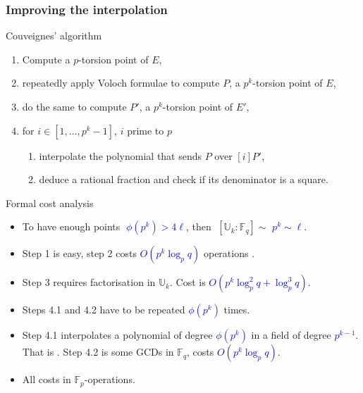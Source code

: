 \documentclass[10pt]{beamer}
\newcommand{\blue}[1]{\textcolor{blue}{#1}}  %
\newcommand{\U}{\mathbb{U}}  %
\newcommand{\F}{\mathbb{F}}  %
\newcommand{\euler}{\phi}  %
\newcommand{\0}{\mathcal{O}}  %
\begin{document}

\begin{frame}
  \frametitle{Improving the interpolation}

  \vspace{-2mm}

  \begin{block}{Couveignes' algorithm}
    \begin{enumerate}
    \item Compute a $p$-torsion point of $E$,
    \item repeatedly apply Voloch formulae to compute $P$, a $p^k$-torsion
      point of $E$,
    \item do the same to compute $P'$, a $p^k$-torsion point
      of $E'$,
    \item for $i \in [1,\dots,p^k-1]$, $i$ prime to $p$
      \begin{enumerate}
      \item interpolate the polynomial that sends $P$ over $[i]P'$,
      \item deduce a rational fraction and check if its denominator is
        a square.
      \end{enumerate}
    \end{enumerate}
  \end{block}

  \vspace{-2mm}

  \begin{block}{Formal cost analysis}
    \begin{itemize}
    \item To have enough points \blue{$\;\euler(p^k) > 4\ell$}, then
      $\;[\U_k:\F_q] \sim$ \blue{$p^k \sim \ell$}.
    \item Step 1 is easy, step 2 costs \blue{$O(p^k\log_pq)$}
      operations .
    \item Step 3 requires factorisation in $\U_k$. Cost is
      \blue{$O(p^{k}\log_p^2q + \log_p^3q)$}.
    \item Steps 4.1 and 4.2 have to be repeated
      \blue{$\euler(p^k)$} times.
    \item Step 4.1 interpolates a polynomial of degree
      \blue{$\euler(p^k)$} in a field of degree \blue{$p^{k-1}$}. That
      is
      \alt<2>{\alert{$O(p^{2k}\log_pq)$}}{\blue{$O(p^{2k}\log_pq)$}}. Step
      4.2 is some GCDs in $\F_q$, costs \blue{$O(p^k\log_pq)$}.
    \item \alert<1>{All costs in $\F_p$-operations.}
    \end{itemize}
  \end{block}
\end{frame}
\end{document}
